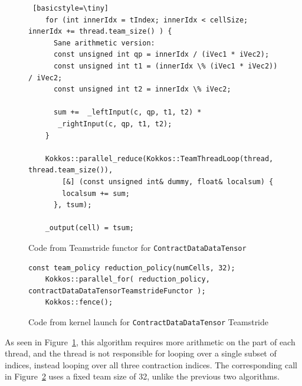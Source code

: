 \begin{figure}[ht]
    \begin{lstlisting} [basicstyle=\tiny]
    for (int innerIdx = tIndex; innerIdx < cellSize; innerIdx += thread.team_size() ) {
      Sane arithmetic version:
      const unsigned int qp = innerIdx / (iVec1 * iVec2);
      const unsigned int t1 = (innerIdx \% (iVec1 * iVec2)) / iVec2;
      const unsigned int t2 = innerIdx \% iVec2;

      sum +=  _leftInput(c, qp, t1, t2) *
       _rightInput(c, qp, t1, t2);
    }

    Kokkos::parallel_reduce(Kokkos::TeamThreadLoop(thread, thread.team_size()),
        [&] (const unsigned int& dummy, float& localsum) {
        localsum += sum;
      }, tsum);

    _output(cell) = tsum;
    \end{lstlisting}

\caption{Code from Teamstride functor for \texttt{ContractDataDataTensor}
\label{lst:ContractDataDataTensorTeamstrideFunctor}} 
\end{figure}

\begin{figure}[ht]
    \begin{lstlisting}[basicstyle=\tiny]
    const team_policy reduction_policy(numCells, 32);
    Kokkos::parallel_for( reduction_policy, contractDataDataTensorTeamstrideFunctor );
    Kokkos::fence();
    \end{lstlisting}
\caption{Code from kernel launch for \texttt{ContractDataDataTensor} Teamstride
\label{lst:ContractDataDataTensorTeamstrideCall}} 
\end{figure}

As seen in Figure~\ref{lst:ContractDataDataTensorTeamstrideFunctor}, this
algorithm requires more arithmetic on the part of each thread, and the thread
is not responsible for looping over a single subset of indices, instead looping
over all three contraction indices. The corresponding call in
Figure~\ref{lst:ContractDataDataTensorTeamstrideCall} uses a fixed team size of
32, unlike the previous two algorithms.

